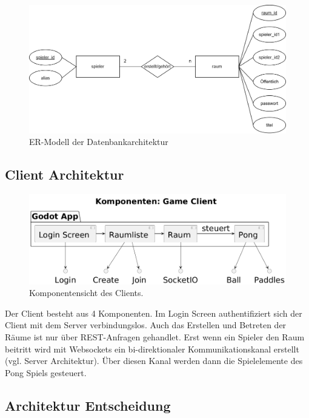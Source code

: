 \documentclass[
]{article}
\begin{document}
\begin{figure}[H]
	\centering
	\includegraphics[width=\textwidth ]{resources/ER-Modell.png}
	\caption{ER-Modell der Datenbankarchitektur}
	\label{fig:ER-Modell}
\end{figure}

\subsection{Client Architektur}
\begin{figure}[H]
	\centering
	\includegraphics[width=\textwidth -80pt ]{resources/Client-Architektur.png}
	\caption{Komponentensicht des Clients.}
	\label{fig:clientarchitektur}
\end{figure}
Der Client besteht aus 4 Komponenten. Im Login Screen authentifiziert sich der Client mit dem Server verbindungslos. Auch das Erstellen und Betreten der Räume ist nur über REST-Anfragen gehandlet. Erst wenn ein Spieler den Raum beitritt wird mit Websockets ein bi-direktionaler Kommunikationskanal erstellt (vgl. Server Architektur). Über diesen Kanal werden dann die Spielelemente des Pong Spiels gesteuert. 


\hypertarget{section-achitactural-decision}{
\subsection{Architektur Entscheidung}}
\end{document}
